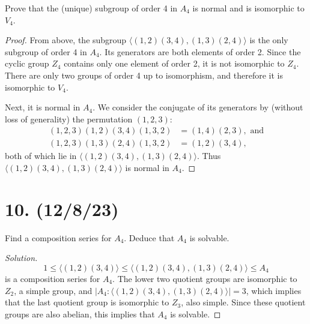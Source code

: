 \documentclass{article}
\begin{document}
Prove that the (unique) subgroup of order 4 in $A_4$ is normal and is isomorphic to $V_4$.

\begin{proof}
    From above, the subgroup $\langle (1, 2)(3, 4), (1, 3)(2, 4) \rangle$ is the only subgroup of order 4 in $A_4$. Its generators are both elements of order 2. Since the cyclic group $Z_4$ contains only one element of order 2, it is not isomorphic to $Z_4$. There are only two groups of order 4 up to isomorphism, and therefore it is isomorphic to $V_4$.

    Next, it is normal in $A_4$. We consider the conjugate of its generators by (without loss of generality) the permutation $(1, 2, 3)$:
    \begin{align*}
        (1, 2, 3)(1, 2)(3, 4)(1, 3, 2) &= (1, 4)(2, 3), \text{ and} \\
        (1, 2, 3)(1, 3)(2, 4)(1, 3, 2) &= (1, 2)(3, 4),
    \end{align*}
    both of which lie in $\langle (1, 2)(3, 4), (1, 3)(2, 4) \rangle$. Thus $\langle (1, 2)(3, 4), (1, 3)(2, 4) \rangle$ is normal in $A_4$.
\end{proof}

\section*{10. (12/8/23)}

Find a composition series for $A_4$. Deduce that $A_4$ is solvable.

\begin{proof}[Solution]
    \begin{equation*}
        1 \leq \langle (1, 2)(3, 4) \rangle \leq \langle (1, 2)(3, 4), (1, 3)(2, 4) \rangle \leq A_4
    \end{equation*}
    is a composition series for $A_4$. The lower two quotient groups are isomorphic to $Z_2$, a simple group, and $|A_4:\langle (1, 2)(3, 4), (1, 3)(2, 4) \rangle| = 3$, which implies that the last quotient group is isomorphic to $Z_3$, also simple. Since these quotient groups are also abelian, this implies that $A_4$ is solvable.
\end{proof}
\end{document}
